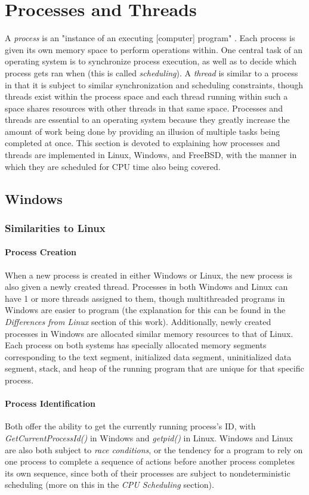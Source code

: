 \documentclass[letterpaper,10pt,titlepage]{article}
\begin{document}
\section{Processes and Threads}
A \emph{process} is an "instance of an executing [computer] program" \cite{linux1}. Each process is given its own memory space to perform operations within. One central task of an operating system is to synchronize process execution, as well as to decide which process gets ran when (this is called \emph{scheduling}). A \emph{thread} is similar to a process in that it is subject to similar synchronization and scheduling constraints, though threads exist within the process space and each thread running within such a space shares resources with other threads in that same space. Processes and threads are essential to an operating system because they greatly increase the amount of work being done by providing an illusion of multiple tasks being completed at once. This section is devoted to explaining how processes and threads are implemented in Linux, Windows, and FreeBSD, with the manner in which they are scheduled for CPU time also being covered.

\subsection{Windows}
% 
%
%
\subsubsection{Similarities to Linux}
\paragraph{Process Creation}
When a new process is created in either Windows or Linux, the new process is also given a newly created thread. Processes in both Windows and Linux can have 1 or more threads assigned to them, though multithreaded programs in Windows are easier to program (the explanation for this can be found in the \emph{Differences from Linux} section of this work). Additionally, newly created processes in Windows are allocated similar memory resources to that of Linux. Each process on both systems has specially allocated memory segments corresponding to the text segment, initialized data segment, uninitialized data segment, stack, and heap of the running program that are unique for that specific process.
\paragraph{Process Identification}
Both offer the ability to get the currently running process's ID, with \emph{GetCurrentProcessId()} in Windows and \emph{getpid()} in Linux. Windows and Linux are also both subject to \emph{race conditions}, or the tendency for a program to rely on one process to complete a sequence of actions before another process completes its own sequence, since both of their processes are subject to nondeterministic scheduling (more on this in the \emph{CPU Scheduling} section).
\end{document}

